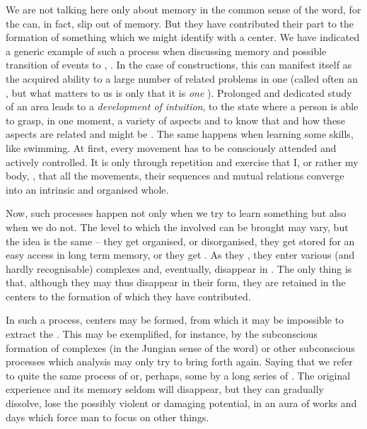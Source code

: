 We are not talking here only about memory in the common sense of the word, for
the   can, in fact, slip out of memory.  But
they have contributed their part to the formation of something which we might
identify with a  center.  We have indicated a generic example of
such a process when discussing memory and possible transition of 
events to , .  In the case of 
constructions, this can manifest itself as the acquired ability to 
a large number of related problems in {one}  (called often an , but what matters to us is only that it is {\em one} ).
Prolonged and dedicated study of an area leads to a {\em development of
  intuition}, to the state where a person is able to grasp, in one moment, a
variety of aspects and to know that and how these aspects are related and might
be .
The same happens when learning some skills, like 
swimming.  At first, every movement has to be consciously attended and actively
controlled.  It is only through repetition and exercise that I, or rather my
body, , that all the movements, their sequences and mutual
relations converge into an intrinsic and organised whole.


\pa Now, such processes happen not only when we try to learn something but also
when we do not.  The level to which the involved  can be brought
may vary, but the idea is the same -- they get organised, or disorganised, they
get stored for an easy access in long term memory, or they get .
As they , they enter various (and hardly recognisable)
complexes and, eventually, disappear in .  The only thing is
that, although they may thus disappear in their  form, they are
retained in the  centers to the formation of which they have
contributed.

In such a process,  centers may be formed, from which it may be
impossible to extract the .  This may be exemplified, for
instance, by the subconscious formation of complexes (in the Jungian sense of
the word) or other subconscious processes which analysis may only try to bring
forth again. Saying that  we refer to quite the same
process of  or, perhaps,  some
 by a long series of . The original experience
and its memory seldom will disappear, but they can gradually dissolve, lose the
possibly violent or damaging potential, in an aura of works and days which force
man to focus on other things. 


